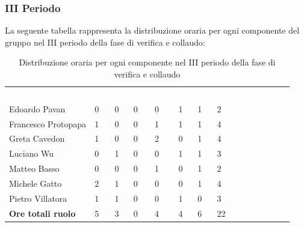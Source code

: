 \subsubsection{III Periodo}
La seguente tabella rappresenta la distribuzione oraria per ogni componente del gruppo nel III periodo della fase di verifica e collaudo:
\begin{table}[H]
\begin{center}
\renewcommand{\arraystretch}{1.25}
\begin{tabular}{ m{}<{\centering}  m{}<{\centering} m{}<{\centering} m{}<{\centering}  m{}<{\centering}  m{}<{\centering}  m{}<{\centering}  m{}<{\centering}   }
	\rowcolor{darkblue}
	\textcolor{white}{\textbf{Componente}} &\textcolor{white}{\textbf{Re}}&\textcolor{white}{\textbf{Pt}}&\textcolor{white}{\textbf{An}}&\textcolor{white}{\textbf{Am}}&\textcolor{white}{\textbf{Pr}}&\textcolor{white}{\textbf{Ve}}&\textcolor{white}{\textbf{Ore complessive}}\\ 
	Edoardo Pavan & 0 & 0 & 0 & 0 & 1 & 1 & 2 \\	
	
	Francesco Protopapa & 1 & 0 & 0 & 1 & 1 & 1 & 4 \\

	Greta Cavedon & 1 & 0 & 0 & 2 & 0 & 1 & 4 \\
	
	Luciano Wu & 0 & 1 & 0 & 0 & 1 & 1 & 3 \\
	
	Matteo Basso & 0 & 0 & 0 & 1 & 0 & 1 & 2 \\
	
	Michele Gatto & 2  & 1 & 0 & 0 & 0 & 1 & 4 \\
	
	Pietro Villatora & 1 & 1 & 0 & 0 & 1 & 0 & 3 \\
	
	\textbf{Ore totali ruolo} & 5 & 3 & 0 & 4 & 4 & 6 & 22 \\

\end{tabular}
\caption{Distribuzione oraria per ogni componente nel III periodo della fase di verifica e collaudo}
\end{center}
\end{table}

